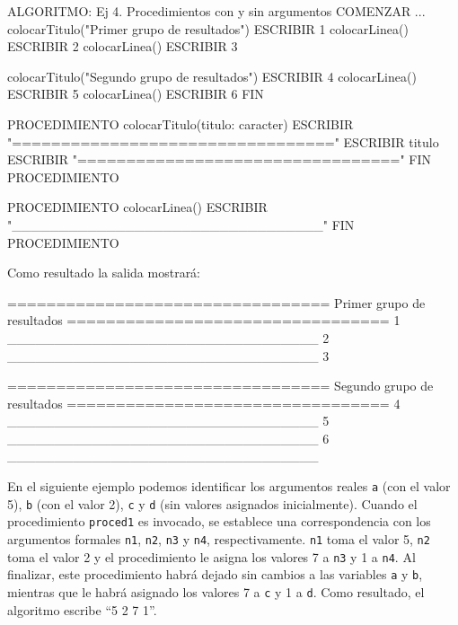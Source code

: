 \documentclass[
]{book}
\newenvironment{Shaded}{\begin{snugshade}}{\end{snugshade}}
\newcommand{\NormalTok}[1]{#1}
\begin{document}
\begin{Shaded}
\begin{Highlighting}[]
\NormalTok{ALGORITMO: Ej 4. Procedimientos con y sin argumentos}
\NormalTok{COMENZAR}
\NormalTok{    ...}
\NormalTok{    colocarTitulo("Primer grupo de resultados")}
\NormalTok{    ESCRIBIR 1}
\NormalTok{    colocarLinea()}
\NormalTok{    ESCRIBIR 2}
\NormalTok{    colocarLinea()}
\NormalTok{    ESCRIBIR 3}

\NormalTok{    colocarTitulo("Segundo grupo de resultados")}
\NormalTok{    ESCRIBIR 4}
\NormalTok{    colocarLinea()}
\NormalTok{    ESCRIBIR 5}
\NormalTok{    colocarLinea()}
\NormalTok{    ESCRIBIR 6}
\NormalTok{FIN}

\NormalTok{PROCEDIMIENTO colocarTitulo(titulo: caracter)}
\NormalTok{    ESCRIBIR "================================="}
\NormalTok{    ESCRIBIR titulo}
\NormalTok{    ESCRIBIR "================================="}
\NormalTok{FIN PROCEDIMIENTO}

\NormalTok{PROCEDIMIENTO colocarLinea()}
\NormalTok{    ESCRIBIR "\_\_\_\_\_\_\_\_\_\_\_\_\_\_\_\_\_\_\_\_\_\_\_\_\_\_\_\_\_\_\_\_\_"}
\NormalTok{FIN PROCEDIMIENTO}
\end{Highlighting}
\end{Shaded}

Como resultado la salida mostrará:

\begin{Shaded}
\begin{Highlighting}[]
\NormalTok{=================================}
\NormalTok{Primer grupo de resultados}
\NormalTok{=================================}
\NormalTok{1}
\NormalTok{\_\_\_\_\_\_\_\_\_\_\_\_\_\_\_\_\_\_\_\_\_\_\_\_\_\_\_\_\_\_\_\_\_}
\NormalTok{2}
\NormalTok{\_\_\_\_\_\_\_\_\_\_\_\_\_\_\_\_\_\_\_\_\_\_\_\_\_\_\_\_\_\_\_\_\_}
\NormalTok{3}

\NormalTok{=================================}
\NormalTok{Segundo grupo de resultados}
\NormalTok{=================================}
\NormalTok{4}
\NormalTok{\_\_\_\_\_\_\_\_\_\_\_\_\_\_\_\_\_\_\_\_\_\_\_\_\_\_\_\_\_\_\_\_\_}
\NormalTok{5}
\NormalTok{\_\_\_\_\_\_\_\_\_\_\_\_\_\_\_\_\_\_\_\_\_\_\_\_\_\_\_\_\_\_\_\_\_}
\NormalTok{6}
\NormalTok{\_\_\_\_\_\_\_\_\_\_\_\_\_\_\_\_\_\_\_\_\_\_\_\_\_\_\_\_\_\_\_\_\_}
\end{Highlighting}
\end{Shaded}

En el siguiente ejemplo podemos identificar los argumentos reales \texttt{a} (con el valor 5), \texttt{b} (con el valor 2), \texttt{c} y \texttt{d} (sin valores asignados inicialmente). Cuando el procedimiento \texttt{proced1} es invocado, se establece una correspondencia con los argumentos formales \texttt{n1}, \texttt{n2}, \texttt{n3} y \texttt{n4}, respectivamente. \texttt{n1} toma el valor 5, \texttt{n2} toma el valor 2 y el procedimiento le asigna los valores 7 a \texttt{n3} y 1 a \texttt{n4}. Al finalizar, este procedimiento habrá dejado sin cambios a las variables \texttt{a} y \texttt{b}, mientras que le habrá asignado los valores 7 a \texttt{c} y 1 a \texttt{d}. Como resultado, el algoritmo escribe ``5 2 7 1''.
\end{document}
